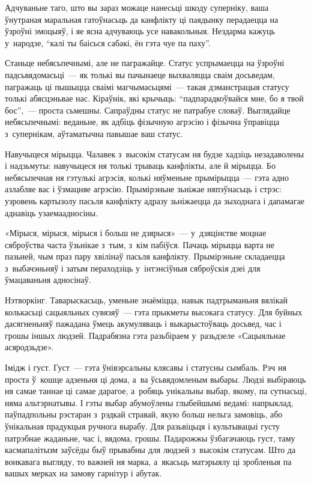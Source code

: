 Адчуваньне таго, што вы зараз можаце нанесьці шкоду суперніку, ваша ўнутраная маральная гатоўнасьць да канфлікту ці паядынку перадаецца на ўзроўні эмоцыяў, і яе ясна адчуваюць усе навакольныя. Нездарма кажуць у~народзе, ``калі ты баісься сабакі, ён гэта чуе па паху''.

Станьце небясьпечнымі, але не пагражайце. Статус успрымаецца на ўзроўні падсьвядомасьці~--- як толькі вы пачынаеце выхваляцца сваім досьведам, пагражаць ці пышыцца сваімі магчымасьцямі~--- такая дэманстрацыя статусу толькі абясцэньвае нас. Кіраўнік, які крычыць: ``падпарадкоўвайся мне, бо я твой бос'',~--- проста сьмешны. Сапраўдны статус не патрабуе словаў. Выглядайце небясьпечнымі: веданьне, як адбіць фізычную агрэсію і фізычна ўправіцца з~супернікам, аўтаматычна павышае ваш статус.

Навучыцеся мірыцца. Чалавек з~высокім статусам ня будзе хадзіць незадаволены і надзьмуты: навучыцеся ня толькі трываць канфлікты, але й мірыцца. Бо небясьпечная ня гэтулькі агрэсія, колькі няўменьне прымірыцца~--- гэта адно азлабляе вас і ўзмацняе агрэсію. Прымірэньне зьніжае няпэўнасьць і стрэс: узровень картызолу пасьля канфлікту адразу зьніжаецца да зыходнага і дапамагае аднавіць узаемаадносіны.

«Мірыся, мірыся, мірыся і больш не дзярыся»~--- у~дзяцінстве моцнае сяброўства часта ўзьнікае з~тым, з~кім пабіўся. Пачаць мірыцца варта не пазьней, чым праз пару хвілінаў пасьля канфлікту. Прымірэньне складаецца з~выбачэньняў і затым пераходзіць у~інтэнсіўныя сяброўскія дзеі для ўмацаваньня адносінаў.

Нэтворкінг. Таварыскасьць, уменьне знаёміцца, навык падтрыманьня вялікай колькасьці сацыяльных сувязяў~--- гэта прыкметы высокага статусу. Для буйных дасягненьняў пажадана ўмець акумуляваць і выкарыстоўваць досьвед, час і грошы іншых людзей. Падрабязна гэта разьбіраем у~разьдзеле «Сацыяльнае асяродзьдзе».

Імідж і густ. Густ~--- гэта ўнівэрсальны клясавы і статусны сымбаль. Рэч ня проста ў~кошце адзеньня ці дома, а~ва ўсьвядомленым выбары. Людзі выбіраюць ня самае таннае ці самае дарагое, а~робяць унікальны выбар, якому, па сутнасьці, няма альтэрнатывы. І гэты выбар абумоўлены глыбейшымі ведамі: напрыклад, паўпадпольны рэстаран з~рэдкай стравай, якую больш нельга замовіць, або ўнікальная прадукцыя ручнога вырабу. Для разьвіцьця і культывацыі густу патрэбнае жаданьне, час і, вядома, грошы. Падарожжы ўзбагачаюць густ, таму касмапалітызм заўсёды быў прывабны для людзей з~высокім статусам. Што да вонкавага выгляду, то важней ня марка, а~якасьць матэрыялу ці зробленыя па вашых мерках на замову гарнітур і абутак.

